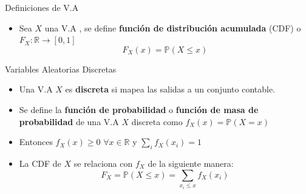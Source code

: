 \documentclass[handout]{beamer}
\begin{document}
\begin{frame}{Definiciones de V.A}
\scriptsize{
\begin{itemize}
 \item Sea $X$ una V.A , se define \textbf{función de distribución acumulada} (CDF) o \ $F_{X}: \mathbb{R} \rightarrow [0,1]$
\begin{displaymath}
 F_{X}(x)=\mathbb{P}(X\leq x)
\end{displaymath}
\end{itemize}

\begin{block}{Variables Aleatorias Discretas}
\begin{itemize}
\item Una V.A $X$ es \textbf{discreta} si mapea las salidas a un conjunto contable.
\item Se define la \textbf{función de probabilidad} o \textbf{función de masa de probabilidad} de una V.A $X$ discreta como $f_{X}(x)=\mathbb{P}(X=x)$
\item Entonces $f_{X}(x) \geq 0$  $\forall x \in \mathbb{R}$ y $\sum_{i}f_{X}(x_{i})=1$
\item La CDF de $X$ se relaciona con $f_{X}$ de la siguiente manera: 
\begin{displaymath}
F_{X}= \mathbb{P}(X\leq x)= \sum_{x_{i} \leq x} f_{X}(x_{i})  
\end{displaymath}
  
\end{itemize}
 
\end{block}



} 
\end{frame}
\end{document}
